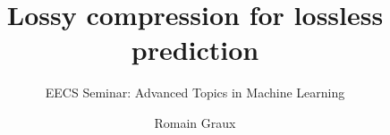 \documentclass{beamer}
\title{Lossy compression for lossless prediction}
\subtitle{EECS Seminar: Advanced Topics in Machine Learning}
\author{Romain Graux}
\begin{document}
\begin{frame}
    \maketitle
\end{frame}
\end{document}
